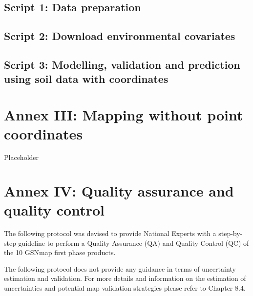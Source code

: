 \documentclass[
  10pt,
  b5paper,
  oneside]{book}
\begin{document}
\hypertarget{script-1-data-preparation}{%
\section*{Script 1: Data preparation}\label{script-1-data-preparation}}

\hypertarget{script-2-download-environmental-covariates}{%
\section*{Script 2: Download environmental covariates}\label{script-2-download-environmental-covariates}}

\hypertarget{script-3-modelling-validation-and-prediction-using-soil-data-with-coordinates}{%
\section*{Script 3: Modelling, validation and prediction using soil data with coordinates}\label{script-3-modelling-validation-and-prediction-using-soil-data-with-coordinates}}

\hypertarget{annex-iii-mapping-without-point-coordinates}{%
\chapter*{Annex III: Mapping without point coordinates}\label{annex-iii-mapping-without-point-coordinates}}

Placeholder

\hypertarget{annex-iv-quality-assurance-and-quality-control}{%
\chapter*{Annex IV: Quality assurance and quality control}\label{annex-iv-quality-assurance-and-quality-control}}

The following protocol was devised to provide National Experts with a step-by-step guideline to perform a Quality Assurance (QA) and Quality Control (QC) of the 10 GSNmap first phase products.

The following protocol does not provide any guidance in terms of uncertainty estimation and validation. For more details and information on the estimation of uncertainties and potential map validation strategies please refer to Chapter 8.4.
\end{document}
